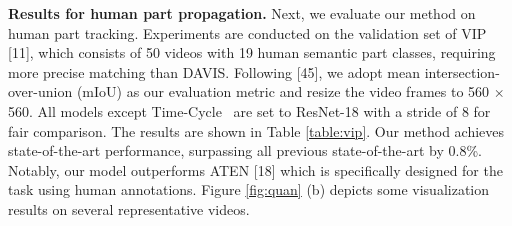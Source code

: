 \documentclass{article}
\begin{document}
\begin{table}
	\centering
	\small
	\captionsetup{font=small}
	\caption{\textbf{Quantitative results for human part propagation and human pose tracking.} We show results of state-of-the-art self-supervised methods and some \textcolor{gray}{supervised} methods for comparison.}
	\label{table:vip}
	\vspace{-5pt}
\end{table}

\textbf{Results for human part propagation.} Next, we evaluate our method on human part tracking. Experiments are conducted on the validation set of VIP [11], which consists of 50 videos with 19 human semantic part classes, requiring more precise matching than DAVIS. Following [45], we adopt mean intersection-over-union (mIoU) as our evaluation metric and resize the video frames to 560 $\times$ 560. All models except Time-Cycle~\cite{wang2019learning} are set to ResNet-18 with a stride of 8 for fair comparison.  The results are shown in Table \ref{table:vip}. Our method achieves state-of-the-art performance, surpassing all previous state-of-the-art by 0.8\%. Notably, our model outperforms ATEN [18] which is specifically designed for the task using human annotations. Figure \ref{fig:quan} (b) depicts some visualization results on several representative videos.
\end{document}
